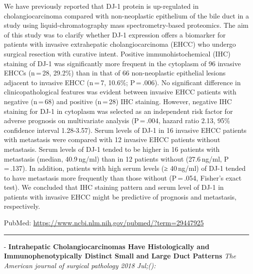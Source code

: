 \documentclass[]{article}
\begin{document}
We have previously reported that DJ-1 protein is up-regulated in
cholangiocarcinoma compared with non-neoplastic epithelium of the bile
duct in a study using liquid-chromatography mass spectrometry-based
proteomics. The aim of this study was to clarify whether DJ-1 expression
offers a biomarker for patients with invasive extrahepatic
cholangiocarcinoma (EHCC) who undergo surgical resection with curative
intent. Positive immunohistochemical (IHC) staining of DJ-1 was
significantly more frequent in the cytoplasm of 96 invasive EHCCs
(n\,=\,28, 29.2\%) than in that of 66 non-neoplastic epithelial lesions
adjacent to invasive EHCC (n\,=\,7, 10.6\%; P\,=\,.006). No significant
difference in clinicopathological features was evident between invasive
EHCC patients with negative (n\,=\,68) and positive (n\,=\,28) IHC
staining. However, negative IHC staining for DJ-1 in cytoplasm was
selected as an independent risk factor for adverse prognosis on
multivariate analysis (P\,=\,.004, hazard ratio 2.13, 95\% confidence
interval 1.28-3.57). Serum levels of DJ-1 in 16 invasive EHCC patients
with metastasis were compared with 12 invasive EHCC patients without
metastasis. Serum levels of DJ-1 tended to be higher in 16 patients with
metastasis (median, 40.9\,ng/ml) than in 12 patients without
(27.6\,ng/ml, P\,=\,.137). In addition, patients with high serum levels
(≥ 40\,ng/ml) of DJ-1 tended to have metastasis more frequently than
those without (P\,=\,.054, Fisher's exact test). We concluded that IHC
staining pattern and serum level of DJ-1 in patients with invasive EHCC
might be predictive of prognosis and metastasis, respectively.

PubMed: \url{https://www.ncbi.nlm.nih.gov/pubmed/?term=29447925}

{}

{}

\begin{center}\rule{0.5\linewidth}{\linethickness}\end{center}

 - \textbf{Intrahepatic Cholangiocarcinomas Have Histologically and
Immunophenotypically Distinct Small and Large Duct Patterns} \emph{The
American journal of surgical pathology 2018 Jul;():}
\end{document}
